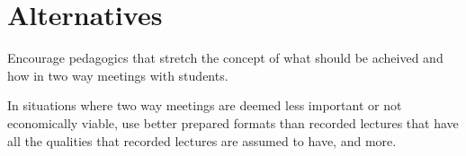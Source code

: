 \documentclass[a4paper,10pt]{article}
\begin{document}
\section{Alternatives}
Encourage pedagogics that stretch the concept of what should be acheived and how in two way meetings with students.

In situations where two way meetings are deemed less important or not economically viable, use better prepared formats than recorded lectures that have all the qualities that recorded lectures are assumed to have, and more.
\end{document}
